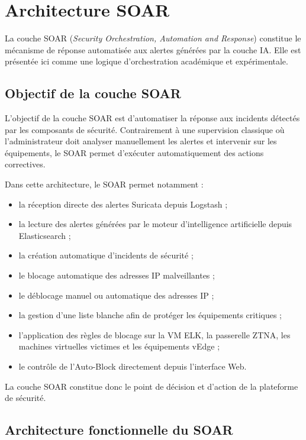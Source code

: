 \documentclass[12pt,a4paper,oneside]{report}
\begin{document}
	\section{Architecture SOAR}
	
	La couche SOAR (\textit{Security Orchestration, Automation and Response})
	constitue le mécanisme de réponse automatisée aux alertes générées par la
	couche IA. Elle est présentée ici comme une logique d'orchestration académique
	et expérimentale.
	
	\subsection{Objectif de la couche SOAR}
	
	L'objectif de la couche SOAR est d'automatiser la réponse aux incidents détectés par les composants de sécurité. Contrairement à une supervision classique où l'administrateur doit analyser manuellement les alertes et intervenir sur les équipements, le SOAR permet d'exécuter automatiquement des actions correctives.
	
	Dans cette architecture, le SOAR permet notamment :
	
	\begin{itemize}
		\item la réception directe des alertes Suricata depuis Logstash ;
		\item la lecture des alertes générées par le moteur d'intelligence artificielle depuis Elasticsearch ;
		\item la création automatique d'incidents de sécurité ;
		\item le blocage automatique des adresses IP malveillantes ;
		\item le déblocage manuel ou automatique des adresses IP ;
		\item la gestion d'une liste blanche afin de protéger les équipements critiques ;
		\item l'application des règles de blocage sur la VM ELK, la passerelle ZTNA, les machines virtuelles victimes et les équipements vEdge ;
		\item le contrôle de l'Auto-Block directement depuis l'interface Web.
	\end{itemize}
	
	La couche SOAR constitue donc le point de décision et d'action de la plateforme de sécurité.
	
	\subsection{Architecture fonctionnelle du SOAR}
	
\end{document}

